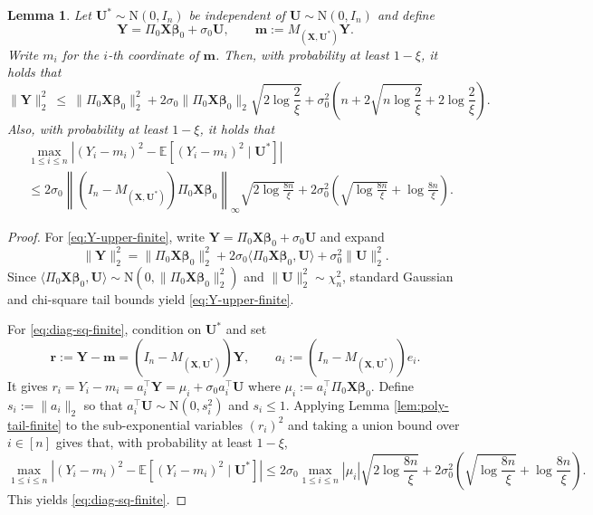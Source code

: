 \documentclass[11pt, reqno]{amsart}
\newcommand{\bE}{\mathbb{E}}
\renewcommand{\le}{\leqslant}
\newcommand{\1}{\mbox{1}\hspace{-0.25em}\mbox{l}}
\newcommand{\Normal}{\mathrm{N}}
\theoremstyle{definition}\newtheorem{problem}{Problem}[section]
\theoremstyle{definition}\newtheorem{definition}[problem]{Definition}
\theoremstyle{remark}\newtheorem{assumption}{Assumption}
\theoremstyle{remark}\newtheorem{remark}[problem]{Remark}
\theoremstyle{definition}\newtheorem{example}[problem]{Example}
\theoremstyle{plain}\newtheorem{theorem}[problem]{Theorem}
\theoremstyle{plain}\newtheorem{question}[problem]{Question}
\theoremstyle{plain}\newtheorem{lemma}[problem]{Lemma}
\theoremstyle{plain}\newtheorem{proposition}[problem]{Proposition}
\theoremstyle{plain}\newtheorem{corollary}[problem]{Corollary}
\theoremstyle{plain}\newtheorem{conjecture}[problem]{Conjecture}
\begin{document}
\begin{lemma}\label{lem:Y-and-diag}
Let $\bm U^*\sim \Normal(0,I_n)$ be independent of $\bm U\sim \Normal(0,I_n)$ and define
\[
\bm Y=\Pi_0\bm X\bm\beta_0+\sigma_0\bm U,
\qquad 
\bm m:=M_{(\bm X,\bm U^*)}\bm Y .
\]
Write $m_i$ for the $i$-th coordinate of $\bm m$.
Then, with probability at least $1-\xi$, it holds that
\begin{equation}\label{eq:Y-upper-finite}
\|\bm Y\|_2^2\ \le\
\|\Pi_0\bm X\bm\beta_0\|_2^2
+2\sigma_0\|\Pi_0\bm X\bm\beta_0\|_2\sqrt{2\log\frac{2}{\xi}}
+\sigma_0^2\left(n+2\sqrt{n\log\frac{2}{\xi}}+2\log\frac{2}{\xi}\right).
\end{equation}
Also, with probability at least $1-\xi$, it holds that
\begin{align}\label{eq:diag-sq-finite}
&\max_{1\le i\le n}\left|(Y_i-m_i)^2-\bE\left[(Y_i-m_i)^2\mid \bm U^*\right]\right|\\ &\le 
2\sigma_0\left\|(I_n-M_{(\bm X,\bm U^*)})\Pi_0\bm X\bm\beta_0\right\|_\infty\sqrt{2\log\frac{8n}{\xi}}
+2\sigma_0^2\left(\sqrt{\log\frac{8n}{\xi}}+\log\frac{8n}{\xi}\right).
\end{align}
\end{lemma}

\begin{proof}
For \eqref{eq:Y-upper-finite}, write $\bm Y=\Pi_0\bm X\bm\beta_0+\sigma_0\bm U$ and expand
\[
\|\bm Y\|_2^2
=
\|\Pi_0\bm X\bm\beta_0\|_2^2
+2\sigma_0\langle \Pi_0\bm X\bm\beta_0,\bm U\rangle
+\sigma_0^2\|\bm U\|_2^2.
\]
Since $\langle \Pi_0\bm X\bm\beta_0,\bm U\rangle\sim \Normal\left(0,\|\Pi_0\bm X\bm\beta_0\|_2^2\right)$ and $\|\bm U\|_2^2\sim \chi_n^2$, standard Gaussian and chi-square tail bounds yield \eqref{eq:Y-upper-finite}.

For \eqref{eq:diag-sq-finite}, condition on $\bm U^*$ and set
\[
\bm r:=\bm Y-\bm m=(I_n-M_{(\bm X,\bm U^*)})\bm Y,
\qquad 
a_i:=(I_n-M_{(\bm X,\bm U^*)})e_i.
\]
It gives $r_i=Y_i-m_i=a_i^\top\bm Y=\mu_i+\sigma_0 a_i^\top \bm U$ where
$\mu_i:=a_i^\top \Pi_0\bm X\bm\beta_0$.
Define $s_i:=\|a_i\|_2$ so that $a_i^\top \bm U\sim \Normal(0,s_i^2)$ and $s_i\le 1$.
Applying Lemma \ref{lem:poly-tail-finite} to the sub-exponential variables $(r_i)^2$ and taking a union bound over $i\in[n]$ gives that, with probability at least $1-\xi$,
\[
\max_{1\le i\le n}\left|(Y_i-m_i)^2-\bE\left[(Y_i-m_i)^2\mid \bm U^*\right]\right|
\le
2\sigma_0\max_{1\le i\le n}|\mu_i|\sqrt{2\log\frac{8n}{\xi}}
+2\sigma_0^2\left(\sqrt{\log\frac{8n}{\xi}}+\log\frac{8n}{\xi}\right).
\]
This yields \eqref{eq:diag-sq-finite}.
\end{proof}
\end{document}
